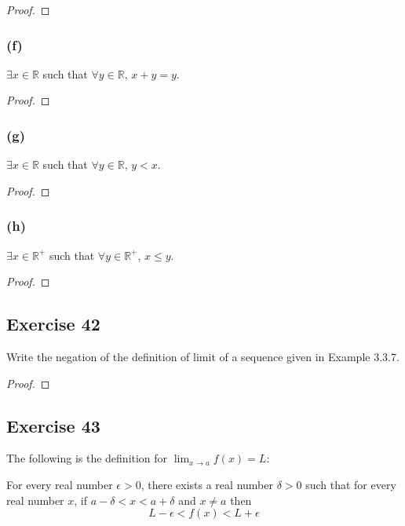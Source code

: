 \documentclass[14pt]{extarticle}
\newcommand{\R}{\mathbb{R}}
\newcommand{\fa}{\forall}
\newcommand{\te}{\exists}
\begin{document}
\begin{proof}

\end{proof}

\subsubsection{(f)}
$\te x \in \R$ such that $\fa y \in \R$, $x + y = y$.

\begin{proof}

\end{proof}

\subsubsection{(g)}
$\te x \in \R$ such that $\fa y \in \R$, $y < x$.

\begin{proof}

\end{proof}

\subsubsection{(h)}
$\te x \in \R^+$ such that $\fa y \in \R^+$, $x \leq y$.

\begin{proof}

\end{proof}

\subsection{Exercise 42}
Write the negation of the definition of limit of a sequence given in Example 3.3.7.

\begin{proof}

\end{proof}

\subsection{Exercise 43}
The following is the definition for $\lim_{x \to a} f(x) = L$:

For every real number $\epsilon > 0$, there exists a real number $\delta > 0$ such that for every real number $x$, if $a - \delta < x < a + \delta$ and $x \neq a$ then 
$$
L - \epsilon < f(x) < L + \epsilon
$$
\end{document}

